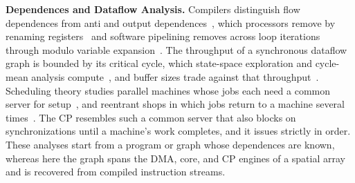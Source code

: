 \textbf{Dependences and Dataflow Analysis.}
Compilers distinguish flow dependences from anti and output dependences~\citep{kuck1981dependence}, which processors remove by renaming registers~\citep{tomasulo1967} and software pipelining removes across loop iterations through modulo variable expansion~\citep{lam1988software}.
The throughput of a synchronous dataflow graph is bounded by its critical cycle, which state-space exploration and cycle-mean analysis compute~\citep{ghamarian2006throughput}, and buffer sizes trade against that throughput~\citep{stuijk2008throughput}.
Scheduling theory studies parallel machines whose jobs each need a common server for setup~\citep{hall2000common,glass2000dedicated}, and reentrant shops in which jobs return to a machine several times~\citep{wang1997reentrant}.
The CP resembles such a common server that also blocks on synchronizations until a machine's work completes, and it issues strictly in order.
These analyses start from a program or graph whose dependences are known, whereas here the graph spans the DMA, core, and CP engines of a spatial array and is recovered from compiled instruction streams.

